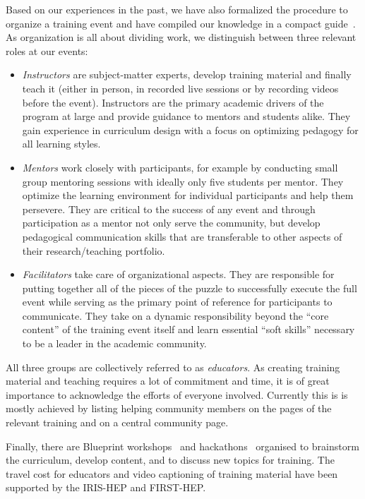 \documentclass[twocolumn]{svjour3}          %
\begin{document}
Based on our experiences in the past, we have also formalized the procedure to organize  a training event and have compiled our knowledge in a compact guide~\cite{HSF-training-how-to}.
As organization is all about dividing work, we distinguish between three relevant roles at our events: 
\begin{itemize}
    \item \emph{Instructors} are subject-matter experts, develop training material and finally teach it (either in person, in recorded live sessions or by recording videos before the event).  Instructors are the primary academic drivers of the program at large and provide guidance to mentors and students alike. They gain experience in curriculum design with a focus on optimizing pedagogy for all learning styles.
    \item \emph{Mentors} work closely with participants, for example by conducting small group mentoring sessions with ideally only five students per mentor. They optimize the learning environment for individual participants and help them persevere.  They are critical to the success of any event and through participation as a mentor not only serve the community, but develop pedagogical communication skills that are transferable to other aspects of their research/teaching portfolio.
    \item \emph{Facilitators} take care of organizational aspects. They are responsible for putting together all of the pieces of the puzzle to successfully execute the full event while serving as the primary point of reference for participants to communicate. They take on a dynamic responsibility beyond the \enquote{core content} of the training event itself and learn essential \enquote{soft skills} necessary to be a leader in the academic community.
\end{itemize}
All three groups are collectively referred to as \emph{educators}.
As creating training material and teaching requires a lot of commitment and time, it is of great importance to acknowledge the efforts of everyone involved. Currently this is is mostly achieved by listing helping community members on the pages of the relevant training and on a central community page.

Finally, there are Blueprint workshops~\cite{HSF-training-blueprint} and hackathons~\cite{HSF-training-hackathon} organised to brainstorm the curriculum, develop content, and to discuss new topics for training. The travel cost for educators and video captioning of training material have been supported by the IRIS-HEP and FIRST-HEP.
\end{document}
